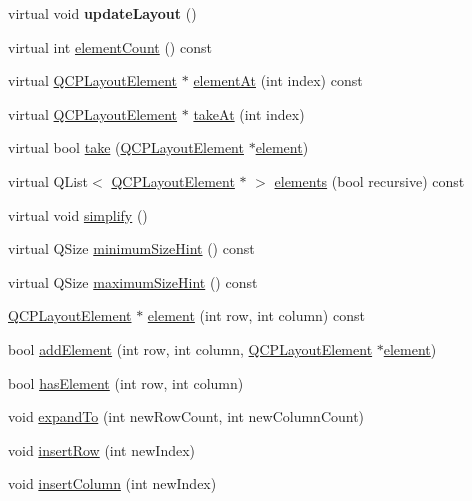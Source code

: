 \begin{DoxyCompactItemize}
\item 
\hypertarget{class_q_c_p_layout_grid_a07f8dd7d3d61d7345026621d446042a4}{}\label{class_q_c_p_layout_grid_a07f8dd7d3d61d7345026621d446042a4} 
virtual void {\bfseries update\+Layout} ()
\item 
virtual int \hyperlink{class_q_c_p_layout_grid_a77f194843d037e0da6d5f3170acdf3a2}{element\+Count} () const
\item 
virtual \hyperlink{class_q_c_p_layout_element}{Q\+C\+P\+Layout\+Element} $\ast$ \hyperlink{class_q_c_p_layout_grid_a97672ecc379cb3a09639926ba9980297}{element\+At} (int index) const
\item 
virtual \hyperlink{class_q_c_p_layout_element}{Q\+C\+P\+Layout\+Element} $\ast$ \hyperlink{class_q_c_p_layout_grid_acc1277394ff8a6432e111ff9463e6375}{take\+At} (int index)
\item 
virtual bool \hyperlink{class_q_c_p_layout_grid_a666a9fe9e92054436f9b66eba25cca0c}{take} (\hyperlink{class_q_c_p_layout_element}{Q\+C\+P\+Layout\+Element} $\ast$\hyperlink{class_q_c_p_layout_grid_a602b426609b4411cf6a93c3ddf3a381a}{element})
\item 
virtual Q\+List$<$ \hyperlink{class_q_c_p_layout_element}{Q\+C\+P\+Layout\+Element} $\ast$ $>$ \hyperlink{class_q_c_p_layout_grid_a20a745d013de4c89cf5de8004a5a36f7}{elements} (bool recursive) const
\item 
virtual void \hyperlink{class_q_c_p_layout_grid_a08bba60e4acd20165526a8fd7f986b58}{simplify} ()
\item 
virtual Q\+Size \hyperlink{class_q_c_p_layout_grid_a9ef4b0d626708a1ada2cfea3a5973b80}{minimum\+Size\+Hint} () const
\item 
virtual Q\+Size \hyperlink{class_q_c_p_layout_grid_a3720d1b79931b2bdec3f2158a5f0181c}{maximum\+Size\+Hint} () const
\item 
\hyperlink{class_q_c_p_layout_element}{Q\+C\+P\+Layout\+Element} $\ast$ \hyperlink{class_q_c_p_layout_grid_a602b426609b4411cf6a93c3ddf3a381a}{element} (int row, int column) const
\item 
bool \hyperlink{class_q_c_p_layout_grid_adff1a2ca691ed83d2d24a4cd1fe17012}{add\+Element} (int row, int column, \hyperlink{class_q_c_p_layout_element}{Q\+C\+P\+Layout\+Element} $\ast$\hyperlink{class_q_c_p_layout_grid_a602b426609b4411cf6a93c3ddf3a381a}{element})
\item 
bool \hyperlink{class_q_c_p_layout_grid_ab0cf4f7edc9414a3bfaddac0f46dc0a0}{has\+Element} (int row, int column)
\item 
void \hyperlink{class_q_c_p_layout_grid_a886c0dcbabd51a45da399e044552b685}{expand\+To} (int new\+Row\+Count, int new\+Column\+Count)
\item 
void \hyperlink{class_q_c_p_layout_grid_a48af3dd7c3a653d9c3d7dd99bd02e838}{insert\+Row} (int new\+Index)
\item 
void \hyperlink{class_q_c_p_layout_grid_a1e880a321dbe8b43b471ccd764433dc4}{insert\+Column} (int new\+Index)
\end{DoxyCompactItemize}
